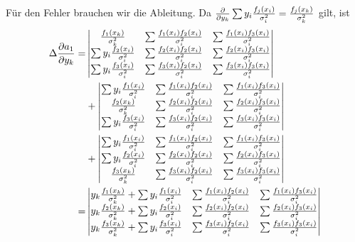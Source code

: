 \documentclass[prb,12pt]{revtex4-2}
\theoremstyle{definition}
\theoremstyle{definition}
\begin{document}
Für den Fehler brauchen wir die Ableitung. Da $\pdv{y_k} \sum y_i \frac{f_j(x_i)}{\sigma_i^2}=\frac{f_j (x_k)}{\sigma_k^2}$ gilt, ist
\begin{align*}
	\Delta \pdv{a_1}{y_k}=& \begin{vmatrix}
		\frac{f_1(x_k)}{\sigma_k^2} & \sum \frac{f_1(x_i)f_2(x_i)}{\sigma_i^2} & \sum \frac{f_1(x_i)f_3(x_i)}{\sigma_i^2} \\
		\sum y_i \frac{f_2(x_i)}{\sigma_i^2} & \sum \frac{f_2(x_i)f_2(x_i)}{\sigma_i^2} & \sum \frac{f_2(x_i)f_3(x_i)}{\sigma_i^2} \\
		\sum y_i \frac{f_3(x_i)}{\sigma_i^2} & \sum \frac{f_3(x_i)f_2(x_i)}{\sigma_i^2} & \sum \frac{f_3(x_i)f_3(x_i)}{\sigma_i^2}
	\end{vmatrix}\\
&+\begin{vmatrix}
	\sum y_i \frac{f_1(x_i)}{\sigma_i^2} & \sum \frac{f_1(x_i)f_2(x_i)}{\sigma_i^2} & \sum \frac{f_1(x_i)f_3(x_i)}{\sigma_i^2} \\
		\frac{f_2(x_k)}{\sigma_k^2} & \sum \frac{f_2(x_i)f_2(x_i)}{\sigma_i^2} & \sum \frac{f_2(x_i)f_3(x_i)}{\sigma_i^2} \\
	\sum y_i \frac{f_3(x_i)}{\sigma_i^2} & \sum \frac{f_3(x_i)f_2(x_i)}{\sigma_i^2} & \sum \frac{f_3(x_i)f_3(x_i)}{\sigma_i^2}
\end{vmatrix}\\
&+\begin{vmatrix}
	\sum y_i \frac{f_1(x_i)}{\sigma_i^2} & \sum \frac{f_1(x_i)f_2(x_i)}{\sigma_i^2} & \sum \frac{f_1(x_i)f_3(x_i)}{\sigma_i^2} \\
	\sum y_i \frac{f_2(x_i)}{\sigma_i^2} & \sum \frac{f_2(x_i)f_2(x_i)}{\sigma_i^2} & \sum \frac{f_2(x_i)f_3(x_i)}{\sigma_i^2} \\
		\frac{f_3(x_k)}{\sigma_k^2} & \sum \frac{f_3(x_i)f_2(x_i)}{\sigma_i^2} & \sum \frac{f_3(x_i)f_3(x_i)}{\sigma_i^2}
\end{vmatrix}\\
=&\begin{vmatrix}
	y_k \frac{f_1(x_k)}{\sigma_k^2}+\sum y_i \frac{f_1(x_i)}{\sigma_i^2} & \sum \frac{f_1(x_i)f_2(x_i)}{\sigma_i^2} & \sum \frac{f_1(x_i)f_3(x_i)}{\sigma_i^2} \\
	y_k \frac{f_2(x_k)}{\sigma_k^2}+\sum y_i \frac{f_2(x_i)}{\sigma_i^2} & \sum \frac{f_2(x_i)f_2(x_i)}{\sigma_i^2} & \sum \frac{f_2(x_i)f_3(x_i)}{\sigma_i^2} \\
	y_k \frac{f_3(x_k)}{\sigma_k^2}+\sum y_i \frac{f_3(x_i)}{\sigma_i^2} & \sum \frac{f_3(x_i)f_2(x_i)}{\sigma_i^2} & \sum \frac{f_3(x_i)f_3(x_i)}{\sigma_i^2}
\end{vmatrix}
\end{align*}
\end{document}
